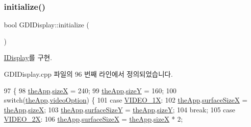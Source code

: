 \subsubsection{\texorpdfstring{initialize()}{initialize()}}
{\footnotesize\ttfamily bool G\+D\+I\+Display\+::initialize (\begin{DoxyParamCaption}{ }\end{DoxyParamCaption})\hspace{0.3cm}{\ttfamily [virtual]}}



\mbox{\hyperlink{class_i_display_aa849b5d829138d08cf9efdbb00364a96}{I\+Display}}를 구현.



G\+D\+I\+Display.\+cpp 파일의 96 번째 라인에서 정의되었습니다.


\begin{DoxyCode}
97 \{
98   \mbox{\hyperlink{_v_b_a_8cpp_a8095a9d06b37a7efe3723f3218ad8fb3}{theApp}}.\mbox{\hyperlink{class_v_b_a_a7b711f29fd088fa6611d240277a24e9e}{sizeX}} = 240;
99   \mbox{\hyperlink{_v_b_a_8cpp_a8095a9d06b37a7efe3723f3218ad8fb3}{theApp}}.\mbox{\hyperlink{class_v_b_a_acb2e7221985fd0355f105cd1ec42e52e}{sizeY}} = 160;
100   \textcolor{keywordflow}{switch}(\mbox{\hyperlink{_v_b_a_8cpp_a8095a9d06b37a7efe3723f3218ad8fb3}{theApp}}.\mbox{\hyperlink{class_v_b_a_a17dac073149c897f770c00ed7098ad32}{videoOption}}) \{
101   \textcolor{keywordflow}{case} \mbox{\hyperlink{_v_b_a_8h_a531c35e38ede3ea4e5ba5afb24b29493a3730d0de76011ce1f8af8b173ba948b1}{VIDEO\_1X}}:
102     \mbox{\hyperlink{_v_b_a_8cpp_a8095a9d06b37a7efe3723f3218ad8fb3}{theApp}}.\mbox{\hyperlink{class_v_b_a_a14ab3c3ab83f07d70e2a40090e37deea}{surfaceSizeX}} = \mbox{\hyperlink{_v_b_a_8cpp_a8095a9d06b37a7efe3723f3218ad8fb3}{theApp}}.\mbox{\hyperlink{class_v_b_a_a7b711f29fd088fa6611d240277a24e9e}{sizeX}};
103     \mbox{\hyperlink{_v_b_a_8cpp_a8095a9d06b37a7efe3723f3218ad8fb3}{theApp}}.\mbox{\hyperlink{class_v_b_a_a63dc67ff3aa9347f32f583fee92cf609}{surfaceSizeY}} = \mbox{\hyperlink{_v_b_a_8cpp_a8095a9d06b37a7efe3723f3218ad8fb3}{theApp}}.\mbox{\hyperlink{class_v_b_a_acb2e7221985fd0355f105cd1ec42e52e}{sizeY}};
104     \textcolor{keywordflow}{break};
105   \textcolor{keywordflow}{case} \mbox{\hyperlink{_v_b_a_8h_a531c35e38ede3ea4e5ba5afb24b29493a27e88963372725d01e5bff4aec1acd55}{VIDEO\_2X}}:
106     \mbox{\hyperlink{_v_b_a_8cpp_a8095a9d06b37a7efe3723f3218ad8fb3}{theApp}}.\mbox{\hyperlink{class_v_b_a_a14ab3c3ab83f07d70e2a40090e37deea}{surfaceSizeX}} = \mbox{\hyperlink{_v_b_a_8cpp_a8095a9d06b37a7efe3723f3218ad8fb3}{theApp}}.\mbox{\hyperlink{class_v_b_a_a7b711f29fd088fa6611d240277a24e9e}{sizeX}} * 2;

\end{DoxyCode}
